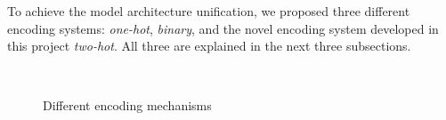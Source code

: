 To achieve the model architecture unification, we proposed three different encoding systems: \textit{one-hot}, \textit{binary}, and the novel encoding system developed in this project \textit{two-hot}. All three are explained in the next three subsections.

\begin{figure}[!t]
 \centering
 
 \caption{Different encoding mechanisms%
 }~\label{Fig:One_binary_Encoding}
\end{figure}



